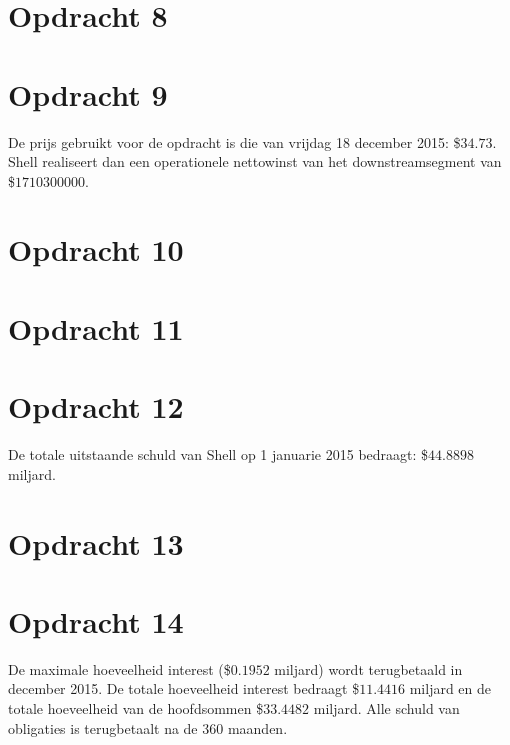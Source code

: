 \documentclass[11pt,a4paper]{article}
\begin{document}
\section*{Opdracht 8}



\section*{Opdracht 9}
De prijs gebruikt voor de opdracht is die van vrijdag 18 december 2015: \$$34.73$.
Shell realiseert dan een operationele nettowinst van het downstreamsegment van \$$1710300000$.



\section*{Opdracht 10}



\section*{Opdracht 11}



\section*{Opdracht 12}
De totale uitstaande schuld van Shell op 1 januarie 2015 bedraagt: \$$44.8898$ miljard.


\section*{Opdracht 13}



\section*{Opdracht 14}
De maximale hoeveelheid interest (\$$0.1952$ miljard) wordt terugbetaald in december 2015. De totale hoeveelheid interest bedraagt \$$11.4416$ miljard en de totale hoeveelheid van de hoofdsommen \$$33.4482$ miljard. 
Alle schuld van obligaties is terugbetaalt na de 360 maanden.

\end{document}
